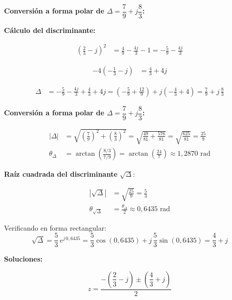 \documentclass[12pt,a4paper]{article}
\begin{document}
 
\textbf{Conversión a forma polar de $\Delta = \dfrac{7}{9} + j\dfrac{8}{3}$:}
 
\textbf{Cálculo del discriminante:}

\begin{align*}
    \left(\frac{2}{3} - j\right)^2 &= \frac{4}{9} - \frac{4j}{3} - 1
                                    = -\frac{5}{9} - \frac{4j}{3}
\end{align*}

\begin{align*}
    -4\left(-\frac{1}{3} - j\right) &= \frac{4}{3} + 4j
\end{align*}

\begin{align*}
    \Delta &= -\frac{5}{9} - \frac{4j}{3} + \frac{4}{3} + 4j
            = \left(-\frac{5}{9} + \frac{12}{9}\right) + j\left(-\frac{4}{3} + 4\right)
            = \frac{7}{9} + j\,\frac{8}{3}
\end{align*}

\textbf{Conversión a forma polar de $\Delta = \dfrac{7}{9} + j\dfrac{8}{3}$:}

\begin{align*}
    |\Delta| &= \sqrt{\left(\frac{7}{9}\right)^2 + \left(\frac{8}{3}\right)^2}
              = \sqrt{\frac{49}{81} + \frac{576}{81}}
              = \sqrt{\frac{625}{81}}
              = \frac{25}{9} \\[6pt]
    \theta_\Delta &= \arctan\!\left(\frac{8/3}{7/9}\right)
                   = \arctan\!\left(\frac{24}{7}\right)
                   \approx 1{,}2870 \text{ rad}
\end{align*}

\textbf{Raíz cuadrada del discriminante} $\sqrt{\Delta}$:

\begin{align*}
    \left|\sqrt{\Delta}\right| &= \sqrt{\frac{25}{9}} = \frac{5}{3} \\[6pt]
    \theta_{\sqrt{\Delta}}     &= \frac{\theta_\Delta}{2} \approx 0{,}6435 \text{ rad}
\end{align*}

Verificando en forma rectangular:
\[
    \sqrt{\Delta} = \frac{5}{3}\,e^{j\,0{,}6435}
                 = \frac{5}{3}\cos(0{,}6435) + j\,\frac{5}{3}\sin(0{,}6435)
                 = \frac{4}{3} + j
\]

\textbf{Soluciones:}

\[
    z = \frac{-\!\left(\dfrac{2}{3}-j\right) \pm \left(\dfrac{4}{3}+j\right)}{2}
\]
\end{document}
